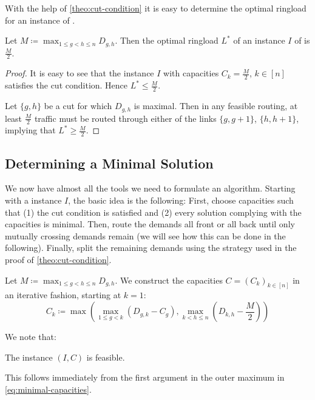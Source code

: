 With the help of \cref{theo:cut-condition} it is easy to determine the optimal ringload for an instance of \RRL.
\begin{corollary}
	Let $M \coloneqq \max_{1 \leq g < h \leq n} D_{g, h}$.
	Then the optimal ringload $L^\ast$ of an instance $I$ of \RRL is $\frac{M}{2}$.
\end{corollary}
\begin{proof}
	It is easy to see that the instance $I$ with capacities $C_k = \frac{M}{2}$, $k \in [n]$ satisfies the cut condition.
	Hence $L^\ast \leq \frac{M}{2}$.
	
	Let $\{g, h\}$ be a cut for which $D_{g, h}$ is maximal.
	Then in any feasible routing, at least $\frac{M}{2}$ traffic must be routed through either of the links $\{g, g+1\}$, $\{h, h+1\}$, implying that $L^\ast \geq \frac{M}{2}$.
\end{proof}
\subsection{Determining a Minimal Solution}

We now have almost all the tools we need to formulate an algorithm.
Starting with a \RRL instance $I$, the basic idea is the following:
First, choose capacities such that (1) the cut condition is satisfied and (2) every solution complying with the capacities is minimal.
Then, route the demands all front or all back until only mutually crossing demands remain (we will see how this can be done in the following).
Finally, split the remaining demands using the strategy used in the proof of \cref{theo:cut-condition}.

Let $M \coloneqq \max_{1 \leq g < h \leq n} D_{g, h}$.
We construct the capacities $C = (C_k)_{k \in [n]}$ in an iterative fashion, starting at $k = 1$:
\begin{equation}
	\label{eq:minimal-capacities}
	C_k \coloneqq \max \left(\max_{1 \leq g < k}(D_{g, k} - C_g), \max_{k < h \leq n}(D_{k, h} - \frac{M}{2})\right)
\end{equation}

We note that:
\begin{proposition}
	The instance $(I, C)$ is feasible.
\end{proposition}
This follows immediately from the first argument in the outer maximum in \cref{eq:minimal-capacities}.

